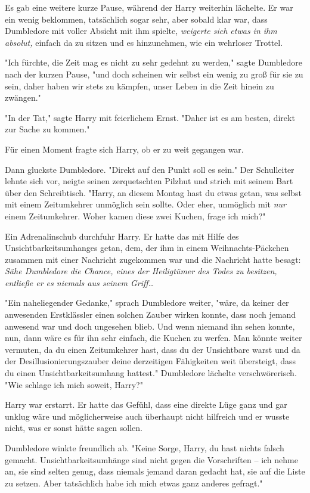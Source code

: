 {Es gab eine weitere kurze Pause, während der Harry weiterhin lächelte. Er war ein wenig beklommen, tatsächlich sogar sehr, aber sobald klar war, dass Dumbledore mit voller Absicht mit ihm spielte, \emph{weigerte sich etwas in ihm absolut,} einfach da zu sitzen und es hinzunehmen, wie ein wehrloser Trottel.

"Ich fürchte, die Zeit mag es nicht zu sehr gedehnt zu werden," sagte Dumbledore nach der kurzen Pause, "und doch scheinen wir selbst ein wenig zu groß für sie zu sein, daher haben wir stets zu kämpfen, unser Leben in die Zeit hinein zu zwängen."

"In der Tat," sagte Harry mit feierlichem Ernst. "Daher ist es am besten, direkt zur Sache zu kommen."

Für einen Moment fragte sich Harry, ob er zu weit gegangen war.

Dann gluckste Dumbledore. "Direkt auf den Punkt soll es sein." Der Schulleiter lehnte sich vor, neigte seinen zerquetschten Pilzhut und strich mit seinem Bart über den Schreibtisch. "Harry, an diesem Montag hast du etwas getan, was selbst mit einem Zeitumkehrer unmöglich sein sollte. Oder eher, unmöglich mit \emph{nur} einem Zeitumkehrer. Woher kamen diese zwei Kuchen, frage ich mich?"

Ein Adrenalinschub durchfuhr Harry. Er hatte das mit Hilfe des Unsichtbarkeitsumhanges getan, dem, der ihm in einem Weihnachts-Päckchen zusammen mit einer Nachricht zugekommen war und die Nachricht hatte besagt: \emph{Sähe Dumbledore die Chance, eines der Heiligtümer des Todes zu besitzen, entließe er es niemals aus seinem Griff…}

"Ein naheliegender Gedanke," sprach Dumbledore weiter, "wäre, da keiner der anwesenden Erstklässler einen solchen Zauber wirken konnte, dass noch jemand anwesend war und doch ungesehen blieb. Und wenn niemand ihn sehen konnte, nun, dann wäre es für ihn sehr einfach, die Kuchen zu werfen. Man könnte weiter vermuten, da du einen Zeitumkehrer hast, dass du der Unsichtbare warst und da der Desillusionierungszauber deine derzeitigen Fähigkeiten weit übersteigt, dass du einen Unsichtbarkeitsumhang hattest." Dumbledore lächelte verschwörerisch. "Wie schlage ich mich soweit, Harry?"

Harry war erstarrt. Er hatte das Gefühl, dass eine direkte Lüge ganz und gar unklug wäre und möglicherweise auch überhaupt nicht hilfreich und er wusste nicht, was er sonst hätte sagen sollen.

Dumbledore winkte freundlich ab. "Keine Sorge, Harry, du hast nichts falsch gemacht. Unsichtbarkeitsumhänge sind nicht gegen die Vorschriften -- ich nehme an, sie sind selten genug, dass niemals jemand daran gedacht hat, sie auf die Liste zu setzen. Aber tatsächlich habe ich mich etwas ganz anderes gefragt."

}
